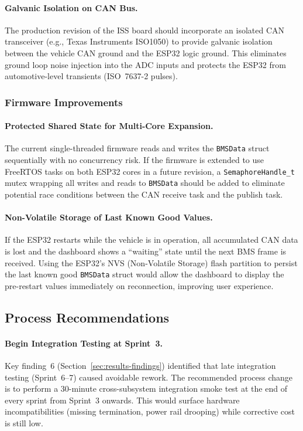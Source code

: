 \paragraph{Galvanic Isolation on CAN Bus.}
The production revision of the ISS board should incorporate an isolated CAN transceiver (e.g., Texas Instruments ISO1050) to provide galvanic isolation between the vehicle CAN ground and the ESP32 logic ground. This eliminates ground loop noise injection into the ADC inputs and protects the ESP32 from automotive-level transients (ISO~7637-2 pulses).

\subsubsection*{Firmware Improvements}

\paragraph{Protected Shared State for Multi-Core Expansion.}
The current single-threaded firmware reads and writes the \texttt{BMSData} struct sequentially with no concurrency risk. If the firmware is extended to use FreeRTOS tasks on both ESP32 cores in a future revision, a \texttt{SemaphoreHandle\_t} mutex wrapping all writes and reads to \texttt{BMSData} should be added to eliminate potential race conditions between the CAN receive task and the publish task.

\paragraph{Non-Volatile Storage of Last Known Good Values.}
If the ESP32 restarts while the vehicle is in operation, all accumulated CAN data is lost and the dashboard shows a ``waiting'' state until the next BMS frame is received. Using the ESP32's NVS (Non-Volatile Storage) flash partition to persist the last known good \texttt{BMSData} struct would allow the dashboard to display the pre-restart values immediately on reconnection, improving user experience.

\subsection{Process Recommendations}

\paragraph{Begin Integration Testing at Sprint~3.}
Key finding~6 (Section~\ref{sec:results-findings}) identified that late integration testing (Sprint~6--7) caused avoidable rework. The recommended process change is to perform a 30-minute cross-subsystem integration smoke test at the end of every sprint from Sprint~3 onwards. This would surface hardware incompatibilities (missing termination, power rail drooping) while corrective cost is still low.

